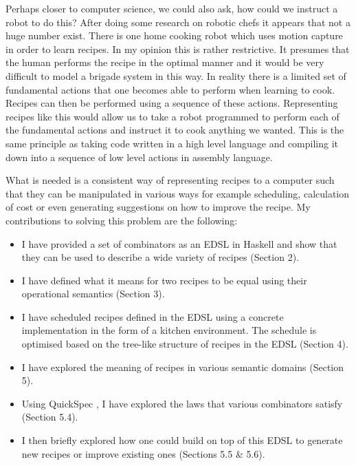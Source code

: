 \documentclass[11pt]{article}
\begin{document}
\medbreak

Perhaps closer to computer science, we could also ask, how could
we instruct a robot to do this? After doing some research on
robotic chefs it appears that not a huge number exist.
There is one home cooking robot \cite{robot} which uses motion
capture in order to learn recipes. In my opinion this is rather
restrictive. It presumes that the human performs the recipe in
the optimal manner and it would be very difficult to model
a brigade system in this way. In reality there is a limited set
of fundamental actions that one becomes able to perform when
learning to cook. Recipes can then be performed using a sequence
of these actions. Representing recipes like this would allow us
to take a robot programmed to perform each of the fundamental
actions and instruct it to cook anything we wanted. This is the
same principle as taking code written in a high level language
and compiling it down into a sequence of low level actions in
assembly language.

\medbreak

What is needed is a consistent way of representing recipes to
a computer such that they can be manipulated in various ways
for example scheduling, calculation of cost or even generating
suggestions on how to improve the recipe. My contributions
to solving this problem are the following:

\begin{itemize}
    \item I have provided a set of combinators as an EDSL in Haskell and show that
    they can be used to describe a wide variety of recipes (Section 2).

    \item I have defined what it means for two recipes to be equal using their
    operational semantics (Section 3).

    \item I have scheduled recipes defined in the EDSL using a concrete implementation
    in the form of a kitchen environment. The schedule is optimised based on the tree-like
    structure of recipes in the EDSL (Section 4).

    \item I have explored the meaning of recipes in various semantic domains (Section 5).

    \item Using QuickSpec \cite{quickspec, quickspec2}, I have explored the laws that
    various combinators satisfy (Section 5.4).

    \item I then briefly explored how one could build on top of this EDSL to generate
    new recipes or improve existing ones (Sections 5.5 \& 5.6).
\end{itemize}
\end{document}
